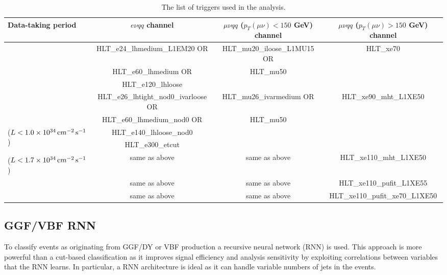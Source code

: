 \begin{landscape}
\begin{table}[p]
  \caption{The list of triggers used in the analysis.} \label{tab:triggers}
\begin{center} 
\small
\begin{tabular}{|l|c|c|c|}
\hline
Data-taking period & $e\nu qq$ channel & $\mu\nu qq$ ($p_{T}(\mu\nu)<150$ GeV) channel & $\mu\nu qq$ ($p_{T}(\mu\nu) > 150$ GeV) channel  \\
\hline
\hline
\multirow{3}{*}{\centering {2015}} & HLT\_e24\_lhmedium\_L1EM20 OR & HLT\_mu20\_iloose\_L1MU15 OR & \multirow{3}{*}{ HLT\_xe70 } \\
 & HLT\_e60\_lhmedium OR & HLT\_mu50 & \\
 & HLT\_e120\_lhloose & & \\
\hline
\multirow{2}{*}{\centering {2016a (run $< 302919$)}} & HLT\_e26\_lhtight\_nod0\_ivarloose OR & HLT\_mu26\_ivarmedium OR  & \multirow{3}{*}{ HLT\_xe90\_mht\_L1XE50 } \\
 & HLT\_e60\_lhmedium\_nod0 OR & HLT\_mu50 &  \\ 
\multirow{2}{*}{($L<1.0\times10^{34}\,{\textrm cm}^{-2}\,{\textrm s}^{-1}$)} & HLT\_e140\_lhloose\_nod0 & & \\
 & HLT\_e300\_etcut & & \\
\hline
{\centering {2016b (run $\geq 302919$)}} & \multirow{2}{*}{same as above} & \multirow{2}{*}{same as above}  &  \multirow{2}{*}{HLT\_xe110\_mht\_L1XE50} \\
($L<1.7\times10^{34}\,{\textrm cm}^{-2}\,{\textrm s}^{-1}$) & & &\\
\hline
{\centering {2017}} & same as above & same as above  &  HLT\_xe110\_pufit\_L1XE55 \\
\hline
{\centering {2018}} & same as above & same as above  &  HLT\_xe110\_pufit\_xe70\_L1XE50  \\
\hline
\end{tabular}
\end{center}
\end{table}
\end{landscape}
\subsection{GGF/VBF RNN}
To classify events as originating from GGF/DY or VBF production a recursive neural network (RNN) is used. This approach is more powerful than a cut-based classification as it improves signal efficiency and analysis sensitivity by exploiting correlations between variables that the RNN learns. In particular, a RNN architecture is ideal as it can handle variable numbers of jets in the events.  

